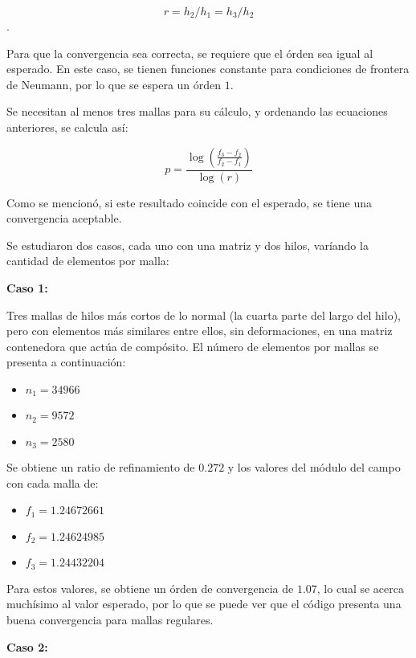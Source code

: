 \documentclass[12pt,letterpaper]{article}
\numberwithin{equation}{section}
\begin{document}
$$r = h_2/h_1=h_3/h_2$$. 

Para que la convergencia sea correcta, se requiere que el órden sea igual al esperado. En este caso, se tienen funciones constante para condiciones de frontera de Neumann, por lo que se espera un órden $1$.

Se necesitan al menos tres mallas para su cálculo, y ordenando las ecuaciones anteriores, se calcula así:

$$p = \frac{\log(\frac{f_3-f_2}{f_2-f_1})}{\log(r)}$$

Como se mencionó, si este resultado coincide con el esperado, se tiene una convergencia aceptable. \cite{paperprofe}

Se estudiaron dos casos, cada uno con una matriz y dos hilos, varíando la cantidad de elementos por malla:

\vspace{3mm}

\textbf{Caso 1:}

\vspace{3mm}

Tres mallas de hilos más cortos de lo normal (la cuarta parte del largo del hilo), pero con elementos más similares entre ellos, sin deformaciones, en una matriz contenedora que actúa de compósito. El número de elementos por mallas se presenta a continuación:

\begin{itemize}
	\item $n_1 = 34966$
	\item $n_2 = 9572$
	\item $n_3 = 2580$
\end{itemize}

Se obtiene un ratio de refinamiento de $0.272$ y los valores del módulo del campo con cada malla de:

\begin{itemize}
	\item $f_1 = 1.24672661$
	\item $f_2 = 1.24624985$
	\item $f_3 = 1.24432204$
\end{itemize}

Para estos valores, se obtiene un órden de convergencia de $1.07$, lo cual se acerca muchísimo al valor esperado, por lo que se puede ver que el código presenta una buena convergencia para mallas regulares.

\vspace{4mm}
\textbf{Caso 2:}
\vspace{3mm}
\end{document}
